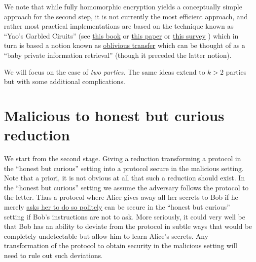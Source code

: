 We note that while fully homomorphic encryption yields a conceptually
simple approach for the second step, it is not currently the most
efficient approach, and rather most practical implementations are based
on the technique known as ``Yao's Garbled Ciruits'' (see
\href{http://u.cs.biu.ac.il/~lindell/efficient-protocols.html}{this
book} or \href{https://eprint.iacr.org/2004/175.pdf}{this paper} or
\href{https://www.cs.uic.edu/pub/Bits/PeterSnyder/Peter_Snyder_-_Garbled_Circuits_WCP_2_column.pdf}{this
survey} ) which in turn is based a notion known as
\href{https://en.wikipedia.org/wiki/Oblivious_transfer}{oblivious
transfer} which can be thought of as a ``baby private information
retrieval'' (though it preceded the latter notion).

We will focus on the case of \emph{two parties}. The same ideas extend
to \(k>2\) parties but with some additional complications.

\section{Malicious to honest but curious
reduction}\label{Malicious-to-honest-but-c}

We start from the second stage. Giving a reduction transforming a
protocol in the ``honest but curious'' setting into a protocol secure in
the malicious setting. Note that a priori, it is not obvious at all that
such a reduction should exist. In the ``honest but curious'' setting we
assume the adversary follows the protocol to the letter. Thus a protocol
where Alice gives away all her secrets to Bob if he merely
\href{https://xkcd.com/424/}{asks her to do so politely} can be secure
in the ``honest but curious'' setting if Bob's instructions are not to
ask. More seriously, it could very well be that Bob has an ability to
deviate from the protocol in subtle ways that would be completely
undetectable but allow him to learn Alice's secrets. Any transformation
of the protocol to obtain security in the malicious setting will need to
rule out such deviations.


